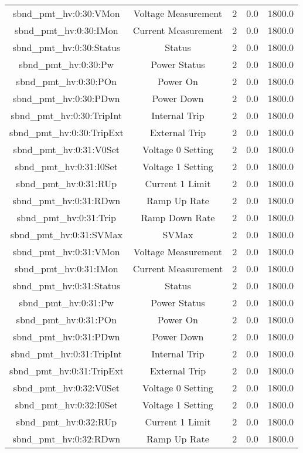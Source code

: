 \begin{center}
\begin{longtable}{c | c c c c }
sbnd\_pmt\_hv:0:30:VMon & Voltage Measurement & 2 & 0.0 & 1800.0\\ 
sbnd\_pmt\_hv:0:30:IMon & Current Measurement & 2 & 0.0 & 1800.0\\ 
sbnd\_pmt\_hv:0:30:Status & Status & 2 & 0.0 & 1800.0\\ 
sbnd\_pmt\_hv:0:30:Pw & Power Status & 2 & 0.0 & 1800.0\\ 
sbnd\_pmt\_hv:0:30:POn & Power On & 2 & 0.0 & 1800.0\\ 
sbnd\_pmt\_hv:0:30:PDwn & Power Down & 2 & 0.0 & 1800.0\\ 
sbnd\_pmt\_hv:0:30:TripInt & Internal Trip & 2 & 0.0 & 1800.0\\ 
sbnd\_pmt\_hv:0:30:TripExt & External Trip & 2 & 0.0 & 1800.0\\ 
sbnd\_pmt\_hv:0:31:V0Set & Voltage 0 Setting & 2 & 0.0 & 1800.0\\ 
sbnd\_pmt\_hv:0:31:I0Set & Voltage 1 Setting & 2 & 0.0 & 1800.0\\ 
sbnd\_pmt\_hv:0:31:RUp & Current 1 Limit & 2 & 0.0 & 1800.0\\ 
sbnd\_pmt\_hv:0:31:RDwn & Ramp Up Rate & 2 & 0.0 & 1800.0\\ 
sbnd\_pmt\_hv:0:31:Trip & Ramp Down Rate & 2 & 0.0 & 1800.0\\ 
sbnd\_pmt\_hv:0:31:SVMax & SVMax & 2 & 0.0 & 1800.0\\ 
sbnd\_pmt\_hv:0:31:VMon & Voltage Measurement & 2 & 0.0 & 1800.0\\ 
sbnd\_pmt\_hv:0:31:IMon & Current Measurement & 2 & 0.0 & 1800.0\\ 
sbnd\_pmt\_hv:0:31:Status & Status & 2 & 0.0 & 1800.0\\ 
sbnd\_pmt\_hv:0:31:Pw & Power Status & 2 & 0.0 & 1800.0\\ 
sbnd\_pmt\_hv:0:31:POn & Power On & 2 & 0.0 & 1800.0\\ 
sbnd\_pmt\_hv:0:31:PDwn & Power Down & 2 & 0.0 & 1800.0\\ 
sbnd\_pmt\_hv:0:31:TripInt & Internal Trip & 2 & 0.0 & 1800.0\\ 
sbnd\_pmt\_hv:0:31:TripExt & External Trip & 2 & 0.0 & 1800.0\\ 
sbnd\_pmt\_hv:0:32:V0Set & Voltage 0 Setting & 2 & 0.0 & 1800.0\\ 
sbnd\_pmt\_hv:0:32:I0Set & Voltage 1 Setting & 2 & 0.0 & 1800.0\\ 
sbnd\_pmt\_hv:0:32:RUp & Current 1 Limit & 2 & 0.0 & 1800.0\\ 
sbnd\_pmt\_hv:0:32:RDwn & Ramp Up Rate & 2 & 0.0 & 1800.0\\ 

\end{longtable}
\end{center}
